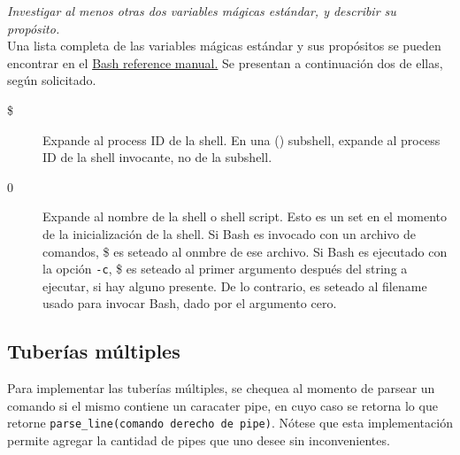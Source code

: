 \documentclass{article}
\begin{document}


\textit{Investigar al menos otras dos variables mágicas estándar, y describir su propósito.}\\

Una lista completa de las variables mágicas estándar y sus propósitos se pueden encontrar en el \href{https://www.gnu.org/software/bash/manual/html\_node/Variable-Index.html}{Bash reference manual.} Se presentan a continuación dos de ellas, según solicitado.\\

\begin{description}
    \item[\$] Expande al process ID de la shell. En una () subshell, expande al process ID de la shell invocante, no de la subshell.
    \item[0] Expande al nombre de la shell o shell script. Esto es un set en el momento de la inicialización de la shell. Si Bash es invocado con un archivo de comandos, \$ es seteado al onmbre de ese archivo. Si Bash es ejecutado con la opción \texttt{-c}, \$ es seteado al primer argumento después del string a ejecutar, si hay alguno presente. De lo contrario, es seteado al filename usado para invocar Bash, dado por el argumento cero.
\end{description}

\subsection{Tuberías múltiples}
Para implementar las tuberías múltiples, se chequea al momento de parsear un comando si el mismo contiene un caracater pipe, en cuyo caso se retorna lo que retorne \texttt{parse\_line(comando derecho de pipe)}. Nótese que esta implementación permite agregar la cantidad de pipes que uno desee sin inconvenientes.


\end{document}
